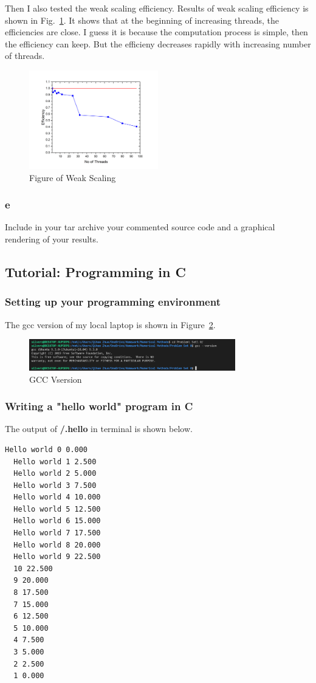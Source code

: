 \documentclass[letterpaper,10pt]{article}
\begin{document}
Then I also tested the weak scaling efficiency. 
Results of weak scaling efficiency is shown in Fig.~\ref{figWS}. It shows that at the beginning of increasing 
threads, the efficiencies are close. I guess it is because the computation process is simple, then 
the efficiency can keep. But the efficieny decreases rapidly with increasing number of threads. 
\begin{figure}[h]
  \centering
  \includegraphics[width=0.5\textwidth]{WeakS.png}
  \caption{Figure of Weak Scaling}
  \label{figWS}
\end{figure}
\subsubsection{e}
Include in your tar archive your commented source code and a graphical rendering of your results. 
\subsection{Tutorial: Programming in C}
\subsubsection{Setting up your programming environment}
The gcc version of my local laptop is shown in Figure~\ref{figGCC}. 
\begin{figure}[h]
  \centering
  \includegraphics[width=0.8\textwidth]{gccEnviron.png}
  \caption{GCC Vsersion}
  \label{figGCC}
\end{figure}

\subsubsection{Writing a "hello world" program in C}
The output of \textbf{/.hello} in terminal is shown below. 
{\small\begin{framed}
\begin{lstlisting}[language=bash]
  Hello world 0 0.000
  Hello world 1 2.500
  Hello world 2 5.000
  Hello world 3 7.500
  Hello world 4 10.000
  Hello world 5 12.500
  Hello world 6 15.000
  Hello world 7 17.500
  Hello world 8 20.000
  Hello world 9 22.500
  10 22.500
  9 20.000
  8 17.500
  7 15.000
  6 12.500
  5 10.000
  4 7.500
  3 5.000
  2 2.500
  1 0.000
  \end{lstlisting}
\end{framed}}
\end{document}
